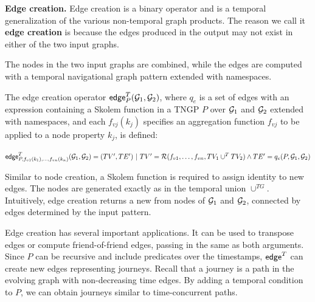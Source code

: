 {\bf Edge creation.}  Edge creation is a binary operator and is a
temporal generalization of the various non-temporal graph products.
The reason we call it {\bf edge creation} is because the edges
produced in the output may not exist in either of the two input
graphs.

The nodes in the two input graphs are combined, while the edges are
computed with a temporal navigational graph pattern extended with
namespaces.

\begin{definition}
\label{def:edgecr}
The edge creation operator $\textsf{edge}^T_{P}(\mathcal{G}_1,\mathcal{G}_2)$, where
$q_e$ is a set of edges with an expression containing a Skolem
function in a TNGP $P$ over $\mathcal{G}_1$ and $\mathcal{G}_2$ extended with
namespaces, and each $f_{vj}(k_j)$ specifies an aggregation function
$f_{vj}$ to be applied to a node property $k_j$, is defined:

$\textsf{edge}^T_{P,f_{v1}(k_1),\ldots,f_{vn}(k_n)}(\ttt_1,\ttt_2) = (TV',TE') ~|~ \break TV' = \resolve{f_{v1},\ldots,f_{vn}}{TV_1 \cup^T TV_2} \land TE' = q_e(P,\ttt_1,\ttt_2)$
\end{definition}

Similar to node creation, a Skolem function is required to assign
identity to new edges.  The nodes are generated exactly as in the
temporal union $\cup^{TG}$.  Intuitively, edge creation returns a
new \tg from nodes of $\mathcal{G}_1$ and $\mathcal{G}_2$, connected by edges
determined by the input pattern.

Edge creation has several important applications.  It can be used to
transpose \tg edges or compute friend-of-friend edges, passing in the
same \tg as both arguments.  Since $P$ can be recursive and include
predicates over the timestamps, $\textsf{edge}^T$ can create new edges
representing journeys.  Recall that a journey is a path in the
evolving graph with non-decreasing time edges.  By adding a temporal
condition to $P$, we can obtain journeys similar to time-concurrent
paths.



